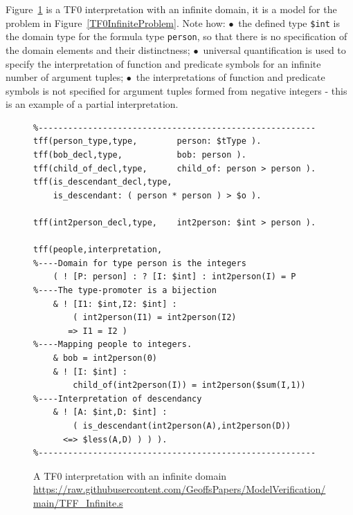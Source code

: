 \documentclass[letterpaper]{article}
\newcommand{\smalltt}[1]{\small \texttt{#1}}
\begin{document}
Figure~\ref{TF0InfiniteInterpretation} is a TF0 interpretation with an infinite domain, it 
is a model for the problem in Figure~\ref{TF0InfiniteProblem}.
Note how:
$\bullet$~the defined type \smalltt{\$int} is the domain type for the formula type \smalltt{person},
so that there is no specification of the domain elements and their distinctness;
$\bullet$~universal quantification is used to specify the interpretation of function and predicate
symbols for an infinite number of argument tuples;
$\bullet$~the interpretations of function and predicate symbols is not specified for argument 
tuples formed from negative integers - this is an example of a partial interpretation.

\begin{figure}[tbhp]
\scriptsize
{}
\begin{verbatim}
%--------------------------------------------------------
tff(person_type,type,        person: $tType ).
tff(bob_decl,type,           bob: person ).
tff(child_of_decl,type,      child_of: person > person ).
tff(is_descendant_decl,type, 
    is_descendant: ( person * person ) > $o ).

tff(int2person_decl,type,    int2person: $int > person ).

tff(people,interpretation,
%----Domain for type person is the integers
    ( ! [P: person] : ? [I: $int] : int2person(I) = P
%----The type-promoter is a bijection
    & ! [I1: $int,I2: $int] : 
        ( int2person(I1) = int2person(I2) 
       => I1 = I2 )
%----Mapping people to integers. 
    & bob = int2person(0)
    & ! [I: $int] : 
        child_of(int2person(I)) = int2person($sum(I,1))
%----Interpretation of descendancy
    & ! [A: $int,D: $int] : 
        ( is_descendant(int2person(A),int2person(D)) 
      <=> $less(A,D) ) ) ).
%--------------------------------------------------------
\end{verbatim}
\caption{A TF0 interpretation with an infinite domain\\
{\scriptsize \url{https://raw.githubusercontent.com/GeoffsPapers/ModelVerification/main/TFF_Infinite.s}}}
\label{TF0InfiniteInterpretation}
\end{figure}

\end{document}
